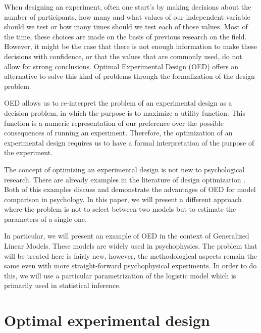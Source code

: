 \documentclass[preprint,review,12pt]{elsarticle}
\begin{document}
When designing an experiment, often one start's by making decisions about the number of participants, how many and what values of our independent variable should we test or how many times should we test each of those values. Most of the time, these choices are made on the basis of previous research on the field. However, it might be the case that there is not enough information to make these decisions with confidence, or that the values that are commonly used, do not allow for strong conclusions. Optimal Experimental Design (OED) offers an alternative to solve this kind of problems through the formalization of the design problem.

OED allows us to re-interpret the problem of an experimental design as a decision problem, in which the purpose is to maximize a utility function. This function is a numeric representation of our preference over the possible consequences of running an experiment. Therefore, the optimization of an experimental design requires us to have a formal interpretation of the purpose of the experiment.

The concept of optimizing an experimental design is not new to psychological research. There are already examples in the literature of design optimization \citep[e.g.][]{Myung2009,ZL2010}. Both of this examples discuss and demonstrate the advantages of OED for model comparison in psychology. In this paper, we will present a different approach where the problem is not to select between two models but to estimate the parameters of a single one.

In particular, we will present an example of OED in the context of Generalized Linear Models. These models are widely used in psychophysics. The problem that will be treated here is fairly new, however, the methodological aspects remain the same even with more straight-forward psychophysical experiments. In order to do this, we will use a particular parametrization of the logistic model which is primarily used in statistical inference.


\section{Optimal experimental design}
\end{document}
